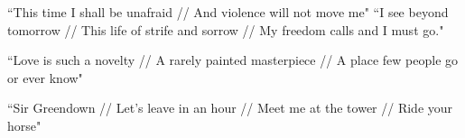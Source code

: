 \documentclass[11pt]{amsart}
\begin{document}
``This time I shall be unafraid // And violence will not move me"\cite{babopbyeya}
``I see beyond tomorrow // This life of strife and sorrow // My freedom calls and I must go."\cite{babopbyeya}

``Love is such a novelty // A rarely painted masterpiece // A place few people go or ever know"\cite{sayyouwillgo}

``Sir Greendown // Let's leave in an hour // Meet me at the tower // Ride your horse"\cite{greendown}

\nocite{*}

{}

\end{document}
